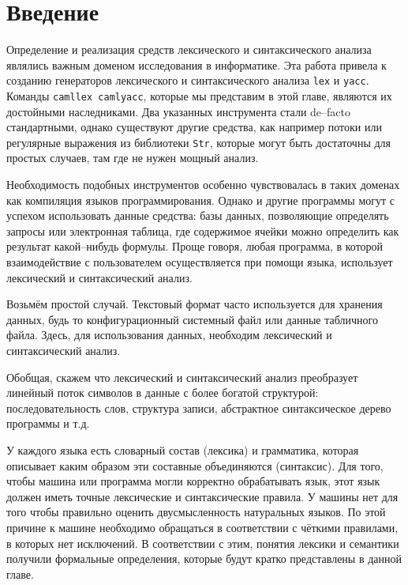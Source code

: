 \section{Введение}

Определение и реализация средств лексического и синтаксического анализа являлись
важным доменом исследования в информатике. Эта работа привела к созданию
генераторов лексического и синтаксического анализа \texttt{lex} и
\texttt{yacc}. Команды \texttt{camllex camlyacc}, которые мы представим в этой
главе, являются их достойными наследниками. Два указанных инструмента стали
de--facto стандартными, однако существуют другие средства, как например потоки
или регулярные выражения из библиотеки \texttt{Str}, которые могут быть
достаточны для простых случаев, там где не нужен мощный анализ.

Необходимость подобных инструментов особенно чувствовалась в таких доменах как
компиляция языков программирования. Однако и другие программы могут с успехом
использовать данные средства: базы данных, позволяющие определять запросы или
электронная таблица, где содержимое ячейки можно определить как результат
какой--нибудь формулы. Проще говоря, любая программа, в которой взаимодействие с
пользователем осуществляется при помощи языка, использует лексический и
синтаксический анализ.

Возьмём простой случай. Текстовый формат часто используется для хранения данных,
будь то конфигурационный системный файл или данные табличного файла. Здесь, для
использования данных, необходим лексический и синтаксический анализ.

Обобщая, скажем что лексический и синтаксический анализ преобразует линейный
поток символов в данные с более богатой структурой: последовательность слов,
структура записи, абстрактное синтаксическое дерево программы и т.д.

У каждого языка есть словарный состав (лексика) и грамматика, которая описывает
каким образом эти составные объединяются (синтаксис). Для того, чтобы машина или
программа могли корректно обрабатывать язык, этот язык должен иметь точные
лексические и синтаксические правила. У машины нет  для
того чтобы правильно оценить двусмысленность натуральных языков. По этой
причине к машине необходимо обращаться в соответствии с чёткими правилами, в
которых нет исключений. В соответствии с этим, понятия лексики и семантики
получили формальные определения, которые будут кратко представлены в данной
главе.